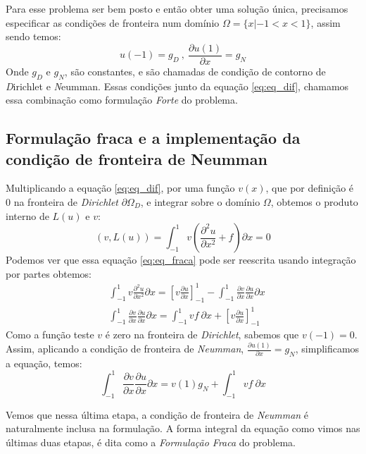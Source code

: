  Para esse problema ser bem posto e então obter uma solução única, precisamos especificar as condições de fronteira num domínio $\Omega = \{x| -1 < x < 1\}$, assim sendo temos:
 \begin{equation}
 u(-1)=g_D\ ,\ \frac{\partial u(1)}{\partial x} = g_N
 \end{equation}
 Onde $g_D$ e $g_N$, são constantes, e são chamadas de condição de contorno de \emph{D}irichlet e \emph{N}eumman. Essas condições junto da equação \eqref{eq:eq_dif}, chamamos essa combinação como formulação \emph{Forte} do problema.
\subsection{Formulação fraca e a implementação da condição de fronteira de Neumman}
 Multiplicando a equação \eqref{eq:eq_dif}, por uma função $v(x)$, que por definição é 0 na fronteira de \emph{Dirichlet} $\partial \Omega_D$, e integrar sobre o domínio $\Omega$, obtemos o produto interno de $L(u)$ e $v$:
 \begin{equation}\label{eq:eq_fraca}
 (v,L(u))=\int^1_{-1} v\left ( \frac{\partial^2u}{\partial x^2} + f \right )\partial x = 0
 \end{equation}
 Podemos ver que essa equação \eqref{eq:eq_fraca} pode ser reescrita usando integração por partes obtemos:
 \begin{align}
& \int^{1}_{-1} v \frac{\partial^2 u}{\partial x^2} \partial x = \left [ v\frac{\partial u}{\partial x}    \right ]^{1}_{-1} - \int^{1}_{-1} \frac{\partial v}{\partial x}  \frac{\partial u}{\partial x}  \partial x \\
&  \int^{1}_{-1} \frac{\partial v}{\partial x}  \frac{\partial u}{\partial x}  \partial x =  \int^{1}_{-1}  v f\ \partial x  + \left [ v\frac{\partial u}{\partial x}    \right ]^{1}_{-1} 
 \end{align}
 Como a função teste $v$ é zero na fronteira de \emph{Dirichlet}, sabemos que $v(-1) = 0$. Assim, aplicando a condição de fronteira de \emph{Neumman}, $\frac{\partial u(1)}{\partial x} = g_N$, simplificamos a equação, temos:
 \begin{equation}
 \int^{1}_{-1} \frac{\partial v}{\partial x}  \frac{\partial u}{\partial x}  \partial x =  v(1)g_N + \int^{1}_{-1}  v f\ \partial x  
\end{equation}

Vemos que nessa última etapa, a condição de fronteira de \emph{Neumman} é naturalmente inclusa na formulação. A forma integral da equação como vimos nas últimas duas etapas, é dita como a \emph{Formulação Fraca} do problema.

